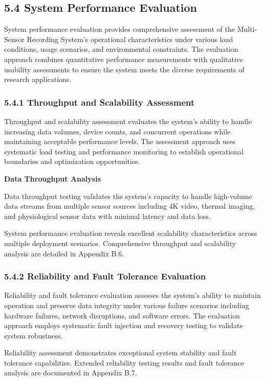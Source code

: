 \documentclass[12pt,a4paper]{article}
\begin{document}
\subsection{5.4 System Performance Evaluation}

System performance evaluation provides comprehensive assessment of the Multi-Sensor Recording System's operational
characteristics under various load conditions, usage scenarios, and environmental constraints. The evaluation approach
combines quantitative performance measurements with qualitative usability assessments to ensure the system meets the
diverse requirements of research applications.

\subsubsection{5.4.1 Throughput and Scalability Assessment}

Throughput and scalability assessment evaluates the system's ability to handle increasing data volumes, device counts,
and concurrent operations while maintaining acceptable performance levels. The assessment approach uses systematic load
testing and performance monitoring to establish operational boundaries and optimization opportunities.

\textbf{Data Throughput Analysis}

Data throughput testing validates the system's capacity to handle high-volume data streams from multiple sensor sources
including 4K video, thermal imaging, and physiological sensor data with minimal latency and data loss.

System performance evaluation reveals excellent scalability characteristics across multiple deployment scenarios.
Comprehensive throughput and scalability analysis are detailed in Appendix B.6.

\subsubsection{5.4.2 Reliability and Fault Tolerance Evaluation}

Reliability and fault tolerance evaluation assesses the system's ability to maintain operation and preserve data
integrity under various failure scenarios including hardware failures, network disruptions, and software errors. The
evaluation approach employs systematic fault injection and recovery testing to validate system robustness.

Reliability assessment demonstrates exceptional system stability and fault tolerance capabilities. Extended reliability
testing results and fault tolerance analysis are documented in Appendix B.7.
\end{document}
